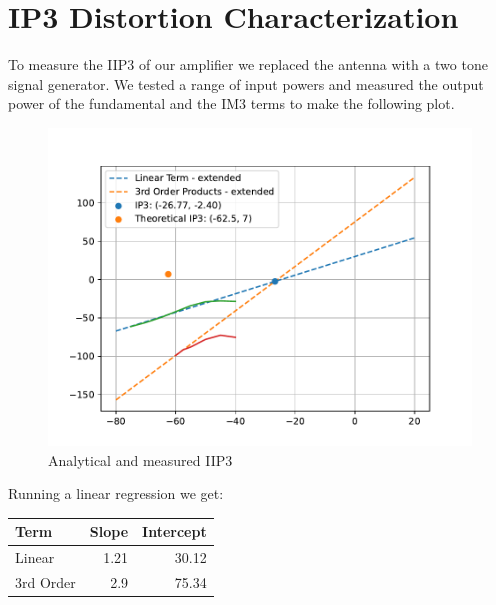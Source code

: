 \documentclass[letterpaper,12pt]{article}
\begin{document}
\section{IP3 Distortion Characterization}
To measure the IIP3 of our amplifier we replaced the antenna with a two tone signal generator. We tested a range of input powers and measured the output power of the fundamental and the IM3 terms to make the following plot.
\begin{figure}[H]
	\begin{centering}
		\includegraphics[width=0.7\columnwidth]{figures/iip3_regression.pdf}
		\caption{Analytical and measured IIP3}
	\end{centering}
\end{figure}
Running a linear regression we get:
\\
\begin{center}
	\begin{tabular}{lrr}
		\toprule
		Term & Slope & Intercept \\
		\midrule
		Linear & 1.21 & 30.12 \\
		3rd Order & 2.9 & 75.34 \\
		\bottomrule
	\end{tabular}
\end{center}
\end{document}
